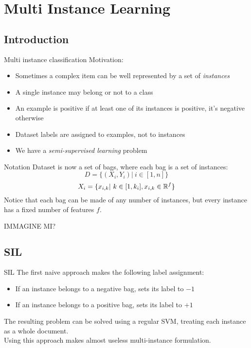 \section{Multi Instance Learning}
 
\subsection*{Introduction}
\begin{frame}{Multi instance classification}
	Motivation:
	\begin{itemize}\setlength\itemsep{1em}
		\item Sometimes a complex item can be well represented by a set of \textit{instances}
		\item A single instance may belong or not to a class
		\item An example is positive if at least one of its instances is positive, it's negative otherwise
		\item Dataset labels are assigned to examples, not to instances
		\item We have a \textit{semi-supervised learning} problem
	\end{itemize}
	\begin{flushright}
		\cite{mi1}
	\end{flushright}
\end{frame}

\begin{frame}{Notation}
	Dataset is now a set of bags, where each bag is a set of instances:
	$$D = \{(X_i, Y_i) | \ i \in [1, n]\}$$
	$$X_i = \{x_{i,k} | \ k \in [1, k_i], x_{i,k} \in \mathbb{R}^f\}$$
	Notice that each bag can be made of any number of instances, but every instance has a fixed number of features $f$.
	
	\color{red}IMMAGINE MI?
\end{frame}

\subsection{SIL}
\begin{frame}{SIL}
	The first naive approach makes the following label assignment:
	\begin{itemize}\setlength\itemsep{1em}
		\item If an instance belongs to a negative bag, sets its label to $-1$
		\item If an instance belongs to a positive bag, sets its label to $+1$
	\end{itemize}
	\vspace{5px}
	The resulting problem can be solved using a regular SVM, treating each instance as a whole document.\\
	\vspace{12px}
	Using this approach makes almost useless multi-instance formulation.
\end{frame}


